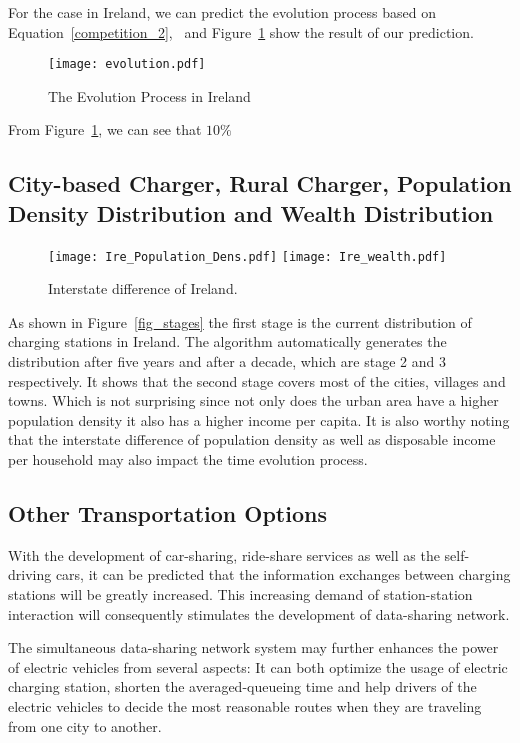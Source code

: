 For the case in Ireland, we can predict the evolution process based on Equation~\ref{competition_2}, \
and Figure~\ref{fig_evolution} show the result of our prediction.
\begin{figure}[!t]
\centering
\texttt{[image: evolution.pdf]}
\caption{The Evolution Process in Ireland}
\label{fig_evolution}
\end{figure}
From Figure~\ref{fig_evolution},
we can see that $10\%$

\subsection{City-based Charger, Rural Charger, Population Density Distribution and Wealth Distribution}
\begin{figure}[h]
\centering
\texttt{[image: Ire\_Population\_Dens.pdf]}
\texttt{[image: Ire\_wealth.pdf]}
\caption{Interstate difference of Ireland.}
\label{fig_stages_Populatoin}
\end{figure}



As shown in Figure~\ref{fig_stages} the first stage is the current distribution of charging stations in Ireland.
The algorithm automatically generates the distribution after five years and after a decade, which are stage 2 and 3 respectively.
It shows that the second stage covers most of the cities, villages and towns.
Which is not surprising since not only does the urban area have a higher population density it also has a higher income per capita.
It is also worthy noting that the interstate difference of population density as well as disposable income per household may also impact the time evolution process.

\subsection{Other Transportation Options}
With the development of car-sharing, ride-share services as well as the self-driving cars,
it can be predicted that the information exchanges between charging stations will be greatly increased.
This increasing demand of station-station interaction will consequently stimulates the development of data-sharing network.

The simultaneous data-sharing network system may further enhances the power of electric vehicles from several aspects:
It can both optimize the usage of electric charging station,
shorten the averaged-queueing time and help drivers of the electric vehicles to decide the most reasonable routes when they are traveling from one city to another.

